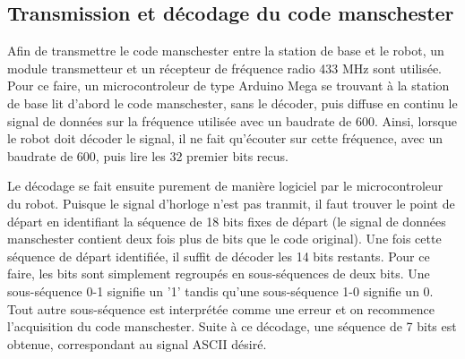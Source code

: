 \subsection{Transmission et décodage du code manschester}

Afin de transmettre le code manschester entre la station de base et le robot, un module transmetteur et un récepteur de fréquence radio 433 MHz sont utilisée. Pour ce faire, un microcontroleur de type Arduino Mega se trouvant à la station de base lit d'abord le code manschester, sans le décoder, puis diffuse en continu le signal de données sur la fréquence utilisée avec un baudrate de 600. Ainsi, lorsque le robot doit décoder le signal, il ne fait qu'écouter sur cette fréquence, avec un baudrate de 600, puis lire les 32 premier bits recus.

Le décodage se fait ensuite purement de manière logiciel par le microcontroleur du robot. Puisque le signal d'horloge n'est pas tranmit, il faut trouver le point de départ en identifiant la séquence de 18 bits fixes de départ (le signal de données manschester contient deux fois plus de bits que le code original). Une fois cette séquence de départ identifiée, il suffit de décoder les 14 bits restants. Pour ce faire, les bits sont simplement regroupés en sous-séquences de deux bits. Une sous-séquence 0-1 signifie un '1' tandis qu'une sous-séquence 1-0 signifie un 0. Tout autre sous-séquence est interprétée comme une erreur et on recommence l'acquisition du code manschester. Suite à ce décodage, une séquence de 7 bits est obtenue, correspondant au signal ASCII désiré.